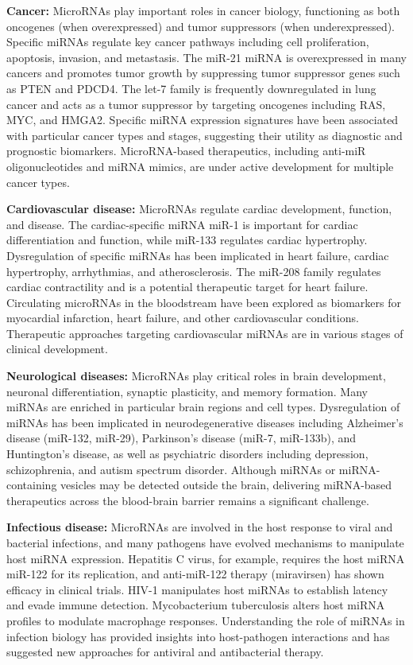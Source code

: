 \textbf{Cancer:} MicroRNAs play important roles in cancer biology, functioning as both oncogenes (when overexpressed) and tumor suppressors (when underexpressed). Specific miRNAs regulate key cancer pathways including cell proliferation, apoptosis, invasion, and metastasis. The miR-21 miRNA is overexpressed in many cancers and promotes tumor growth by suppressing tumor suppressor genes such as PTEN and PDCD4. The let-7 family is frequently downregulated in lung cancer and acts as a tumor suppressor by targeting oncogenes including RAS, MYC, and HMGA2. Specific miRNA expression signatures have been associated with particular cancer types and stages, suggesting their utility as diagnostic and prognostic biomarkers. MicroRNA-based therapeutics, including anti-miR oligonucleotides and miRNA mimics, are under active development for multiple cancer types.

\textbf{Cardiovascular disease:} MicroRNAs regulate cardiac development, function, and disease. The cardiac-specific miRNA miR-1 is important for cardiac differentiation and function, while miR-133 regulates cardiac hypertrophy. Dysregulation of specific miRNAs has been implicated in heart failure, cardiac hypertrophy, arrhythmias, and atherosclerosis. The miR-208 family regulates cardiac contractility and is a potential therapeutic target for heart failure. Circulating microRNAs in the bloodstream have been explored as biomarkers for myocardial infarction, heart failure, and other cardiovascular conditions. Therapeutic approaches targeting cardiovascular miRNAs are in various stages of clinical development.

\textbf{Neurological diseases:} MicroRNAs play critical roles in brain development, neuronal differentiation, synaptic plasticity, and memory formation. Many miRNAs are enriched in particular brain regions and cell types. Dysregulation of miRNAs has been implicated in neurodegenerative diseases including Alzheimer's disease (miR-132, miR-29), Parkinson's disease (miR-7, miR-133b), and Huntington's disease, as well as psychiatric disorders including depression, schizophrenia, and autism spectrum disorder. Although miRNAs or miRNA-containing vesicles may be detected outside the brain, delivering miRNA-based therapeutics across the blood-brain barrier remains a significant challenge.

\textbf{Infectious disease:} MicroRNAs are involved in the host response to viral and bacterial infections, and many pathogens have evolved mechanisms to manipulate host miRNA expression. Hepatitis C virus, for example, requires the host miRNA miR-122 for its replication, and anti-miR-122 therapy (miravirsen) has shown efficacy in clinical trials. HIV-1 manipulates host miRNAs to establish latency and evade immune detection. Mycobacterium tuberculosis alters host miRNA profiles to modulate macrophage responses. Understanding the role of miRNAs in infection biology has provided insights into host-pathogen interactions and has suggested new approaches for antiviral and antibacterial therapy.

